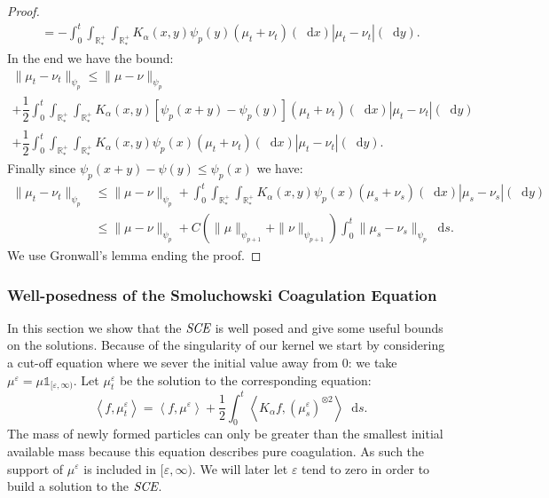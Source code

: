 \documentclass[11pt,a4paper]{article}
\newcommand{\RRP}{\mathbb{R}^+_*}
\newcommand{\SCE}{\emph{SCE}}
\newcommand{\brac}[1]{\left\langle#1\right\rangle}
\newcommand{\dd}{\mathop{}\!\mathrm{d}}
\begin{document}
\begin{proof}
\begin{multline*}
        = -\int_0^t \int_{\RRP}\int_{\RRP} K_\alpha(x,y) \psi_p(y)\left(\mu_t + \nu_t\right)(\dd x) \left|\mu_t - \nu_t\right|(\dd y).
    \end{multline*}
    In the end we have the bound:
    \begin{multline*}
        \| \mu_t - \nu_t\|_{\psi_p} \leq \|\mu- \nu\|_{\psi_p} \\
        + \dfrac12\int_0^t \int_{\RRP}\int_{\RRP} K_\alpha(x,y) \left[\psi_p(x+y) - \psi_p(y) \right]\left(\mu_t + \nu_t\right)(\dd x) \left|\mu_t - \nu_t\right|(\dd y) \\
        + \dfrac12\int_0^t \int_{\RRP}\int_{\RRP} K_\alpha(x,y)\psi_p(x)\left(\mu_t + \nu_t\right)(\dd x) \left|\mu_t - \nu_t\right|(\dd y).
    \end{multline*}
    Finally since $\psi_p(x+y) - \psi(y) \leq \psi_p(x)$ we have:
    \begin{align*}
        \| \mu_t - \nu_t\|_{\psi_p} &\leq \|\mu- \nu\|_{\psi_p} + \int_0^t \int_{\RRP}\int_{\RRP} K_\alpha(x,y)\psi_p(x)\left(\mu_s + \nu_s\right)(\dd x) \left|\mu_s - \nu_s\right|(\dd y)\\
        &\leq \|\mu- \nu\|_{\psi_p} + C\left(\|\mu\|_{\psi_{p+1}} + \|\nu\|_{\psi_{p+1}}\right) \int_0^t \|\mu_s - \nu_s \|_{\psi_p}\dd s.
    \end{align*}
    We use Gronwall's lemma ending the proof.
\end{proof}

\subsubsection{Well-posedness of the Smoluchowski Coagulation Equation}
In this section we show that the $\SCE$ is well posed and give some useful bounds on the solutions. Because of the singularity of our kernel we start by considering a cut-off equation where we sever the initial value away from $0$: we take $\mu^\varepsilon = \mu\mathds{1}_{[\varepsilon,\infty)}$. Let $\mu^\varepsilon_t$ be the solution to the corresponding equation:
\begin{equation}\label{eq:cutoff_SCE}
    \brac{f, \mu^\varepsilon_t} = \brac{f,\mu^\varepsilon} + \dfrac12\int_0^t \brac{K_\alpha f,\left(\mu^\varepsilon_s\right)^{\otimes 2}} \dd s.
\end{equation}
The mass of newly formed particles can only be greater than the smallest initial available mass because this equation describes pure coagulation. As such the support of $\mu^\varepsilon$ is included in $[\varepsilon,\infty)$. We will later let $\varepsilon$ tend to zero in order to build a solution to the $\SCE$.
\end{document}
